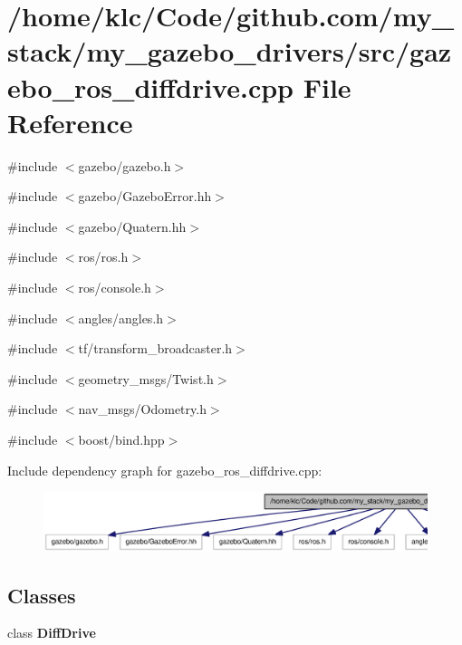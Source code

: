 \section{/home/klc/Code/github.com/my\_\-stack/my\_\-gazebo\_\-drivers/src/gazebo\_\-ros\_\-diffdrive.cpp File Reference}
\label{gazebo__ros__diffdrive_8cpp}
{\ttfamily \#include $<$gazebo/gazebo.h$>$}\par
{\ttfamily \#include $<$gazebo/GazeboError.hh$>$}\par
{\ttfamily \#include $<$gazebo/Quatern.hh$>$}\par
{\ttfamily \#include $<$ros/ros.h$>$}\par
{\ttfamily \#include $<$ros/console.h$>$}\par
{\ttfamily \#include $<$angles/angles.h$>$}\par
{\ttfamily \#include $<$tf/transform\_\-broadcaster.h$>$}\par
{\ttfamily \#include $<$geometry\_\-msgs/Twist.h$>$}\par
{\ttfamily \#include $<$nav\_\-msgs/Odometry.h$>$}\par
{\ttfamily \#include $<$boost/bind.hpp$>$}\par
Include dependency graph for gazebo\_\-ros\_\-diffdrive.cpp:
\nopagebreak
\begin{figure}[H]
\begin{center}
\leavevmode
\includegraphics[width=400pt]{gazebo__ros__diffdrive_8cpp__incl}
\end{center}
\end{figure}
\subsection*{Classes}
\begin{DoxyCompactItemize}
\item 
class {\bf DiffDrive}
\end{DoxyCompactItemize}
